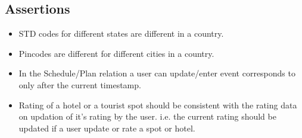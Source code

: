 \documentclass[11pt]{article}
\begin{document}
\subsection{Assertions}
\begin{itemize}
\item STD codes for different states are different in a country.
\item Pincodes are different for different cities in a country.
\item In the Schedule/Plan relation a user can update/enter event corresponds to  only after the current timestamp.
\item Rating of a hotel or a tourist spot should be consistent with the rating data on updation of it’s rating by the user. i.e. the current rating should be updated if a user update or rate a spot or hotel.
\end{itemize}
\end{document}
